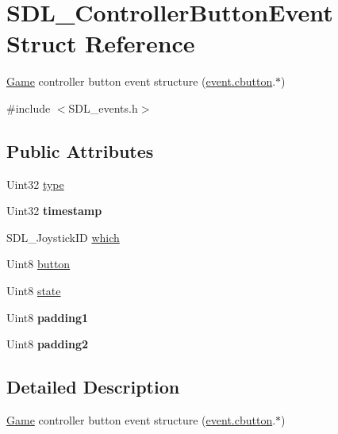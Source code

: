 \hypertarget{structSDL__ControllerButtonEvent}{\section{S\+D\+L\+\_\+\+Controller\+Button\+Event Struct Reference}
\label{structSDL__ControllerButtonEvent}
}


\hyperlink{classGame}{Game} controller button event structure (\hyperlink{unionSDL__Event_aee2b5671c8dcdb447023715cc21593cb}{event.\+cbutton}.$\ast$)  




{\ttfamily \#include $<$S\+D\+L\+\_\+events.\+h$>$}

\subsection*{Public Attributes}
\begin{DoxyCompactItemize}
\item 
Uint32 \hyperlink{structSDL__ControllerButtonEvent_a09869d792031e47a88673d85915c209f}{type}
\item 
\hypertarget{structSDL__ControllerButtonEvent_a73003712734c4d2f966db3d7c2ce826b}{Uint32 {\bfseries timestamp}}\label{structSDL__ControllerButtonEvent_a73003712734c4d2f966db3d7c2ce826b}

\item 
S\+D\+L\+\_\+\+Joystick\+I\+D \hyperlink{structSDL__ControllerButtonEvent_a98777e88b5d5cae83eef16ffd4bcacc1}{which}
\item 
Uint8 \hyperlink{structSDL__ControllerButtonEvent_a039da6cd31c3c62e62a3ae17cc64d0db}{button}
\item 
Uint8 \hyperlink{structSDL__ControllerButtonEvent_a00c46683f86674c2a4f74404ee3e857c}{state}
\item 
\hypertarget{structSDL__ControllerButtonEvent_a34d3e43fc1994288b9b083c874bc0899}{Uint8 {\bfseries padding1}}\label{structSDL__ControllerButtonEvent_a34d3e43fc1994288b9b083c874bc0899}

\item 
\hypertarget{structSDL__ControllerButtonEvent_a8caf56a3921227913cfb652d5de1eec4}{Uint8 {\bfseries padding2}}\label{structSDL__ControllerButtonEvent_a8caf56a3921227913cfb652d5de1eec4}

\end{DoxyCompactItemize}


\subsection{Detailed Description}
\hyperlink{classGame}{Game} controller button event structure (\hyperlink{unionSDL__Event_aee2b5671c8dcdb447023715cc21593cb}{event.\+cbutton}.$\ast$) 

